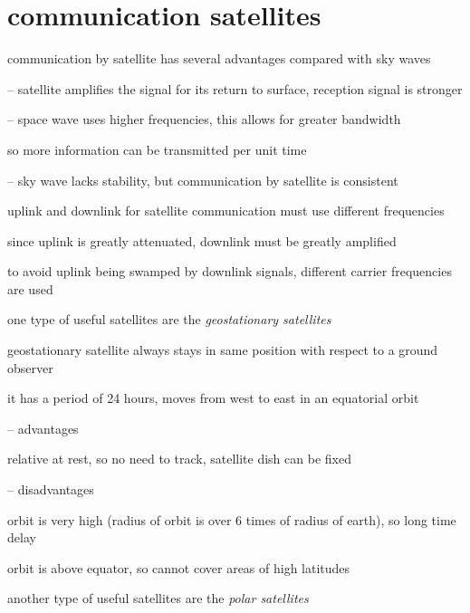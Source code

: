 \section*{communication satellites}

\cmt communication by satellite has several advantages compared with sky waves

\begin{compactitem}
	\item[--] satellite amplifies the signal for its return to surface, reception signal is stronger
	
	\item[--] space wave uses higher frequencies, this allows for greater bandwidth
	
	so more information can be transmitted per unit time
	
	\item[--] sky wave lacks stability, but communication by satellite is consistent
\end{compactitem}

\cmt uplink and downlink for satellite communication must use different frequencies

since uplink is greatly attenuated, downlink must be greatly amplified

to avoid uplink being swamped by downlink signals, different carrier frequencies are used

\cmt one type of useful satellites are the \emph{geostationary satellites}

geostationary satellite always stays in same position with respect to a ground observer

it has a period of 24 hours, moves from west to east in an equatorial orbit

\begin{compactitem}
	\item[--] advantages
	
	relative at rest, so no need to track, satellite dish can be fixed
	
	\item[--] disadvantages
	
	orbit is very high (radius of orbit is over 6 times of radius of earth), so long time delay
	
	orbit is above equator, so cannot cover areas of high latitudes
\end{compactitem}


\cmt another type of useful satellites are the \emph{polar satellites}

